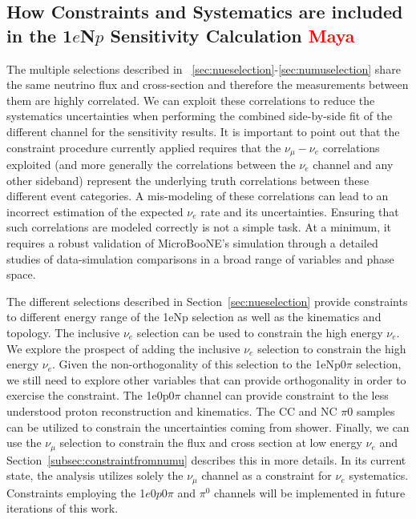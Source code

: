 \documentclass[a4paper]{article}
\newcommand{\zpsel}{1$e$0$p$0$\pi$ }
\begin{document}
\subsection{How Constraints and Systematics are included in the 1$e$N$p$ Sensitivity Calculation \textcolor{red}{Maya}}
\label{ssec:finalSensitivityCalc}

The multiple selections described in  ~\ref{sec:nueselection}-\ref{sec:numuselection} share the same neutrino flux and cross-section and therefore the measurements between them are highly correlated. We can exploit these correlations to reduce the systematics uncertainties when performing the combined side-by-side fit of the different channel for the sensitivity results. It is important to point out that the constraint procedure currently applied requires that the $\nu_{\mu} - \nu_e$ correlations exploited (and more generally the correlations between the $\nu_e$ channel and any other sideband) represent the underlying truth correlations between these different event categories. A mis-modeling of these correlations can lead to an incorrect estimation of the expected $\nu_e$ rate and its uncertainties. Ensuring that such correlations are modeled correctly is not a simple task. At a minimum, it requires a robust validation of MicroBooNE's simulation through a detailed studies of data-simulation comparisons in a broad range of variables and phase space.

The different selections described in Section~\ref{sec:nueselection} provide constraints to different energy range of the 1eNp selection as well as the kinematics and topology. The inclusive $\nu_e$ selection can be used to constrain the high energy $\nu_e$. We explore the prospect of adding the inclusive $\nu_e$ selection to constrain the high energy $\nu_e$. Given the non-orthogonality of this selection to the 1eNp0$\pi$ selection, we still need to explore other variables that can provide orthogonality in order to exercise the constraint. The 1e0p0$\pi$ channel can provide constraint to the less understood proton reconstruction and kinematics. The CC and NC $\pi0$ samples can be utilized to constrain the uncertainties coming from shower. Finally, we can use the $\nu_\mu$ selection to constrain the flux and cross section at low energy $\nu_e$ and Section~\ref{subsec:constraintfromnumu} describes this in more details. In its current state, the analysis utilizes solely the  $\nu_{\mu}$ channel as a constraint for $\nu_e$ systematics. Constraints employing the \zpsel and $\pi^0$ channels will be implemented in future iterations of this work.
\end{document}
